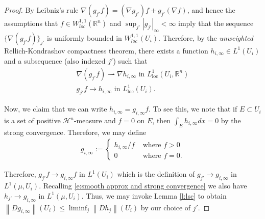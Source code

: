 \documentclass[12pt]{amsart}
\numberwithin{equation}{section}
\theoremstyle{plain}
\theoremstyle{definition}
\newcommand{\norm}[1]{\left\lVert#1\right\rVert}
\newcommand{\loc}{\mathrm{loc}}
\begin{document}
\begin{proof}

By Leibniz's rule $\nabla (g_{j'} f) = (\nabla g_{j'}) f + g_{j'} (\nabla f)$, and hence the assumptions that $f \in W^{1,1}_{loc}(\mathbb{R}^n)$ and $\sup_{j'}|g_{j'}|_{\infty} <\infty$ imply that the sequence $\{\nabla (g_{j'} f)\}_{j'}$ is uniformly bounded in $W^{1,1}_{loc}(U_i)$. Therefore, by the \textit{unweighted} Rellich-Kondrashov compactness theorem, there exists a function $h_{i, \infty} \in L^1(U_i)$ and a subsequence (also indexed $j'$) such that
\begin{align*}
    \nabla (g_{j'}f) \rightharpoonup \nabla h_{i,\infty} \text{ in } L^1_{\loc}(U_i, \mathbb{R}^n)\\
    g_{j'}f \rightarrow  h_{i,\infty} \text{ in } L^1_{\loc}(U_i).
\end{align*}

Now, we claim that we can write $h_{i, \infty} = g_{i,\infty}f$.  To see this, we note that if $E \subset U_i$ is a set of positive $\mathcal{H}^n$-measure and $f=0$ on $E$, then $\int_E h_{i,\infty} dx = 0$ by the strong convergence.  Therefore, we may define 
\begin{align*}
    g_{i, \infty}:= \begin{cases}
        h_{i, \infty}/f & \text{ where } f>0\\
        0 & \text{ where } f=0.
    \end{cases}
\end{align*}

Therefore, $g_{j'}f \rightarrow g_{i, \infty}f$ in $L^1(U_i)$ which is the definition of $g_{j'} \rightarrow g_{i,\infty}$ in $L^1(\mu, U_i)$.  Recalling \eqref{e:smooth approx and strong convergence} we also have $h_{j'} \rightarrow g_{i, \infty}$ in $L^1(\mu, U_i)$.  Thus, we may invoke Lemma \ref{l:lsc} to obtain $\norm{Dg_{i, \infty}}(U_i) \le \liminf_j \norm{Dh_j}(U_i)$ by our choice of $j'$.


\end{proof}
\end{document}
